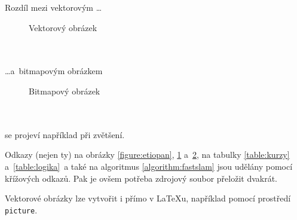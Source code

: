 \documentclass[a4paper, 11pt]{article}
\begin{document}
	Rozdíl mezi vektorovým \dots
	\begin{figure}[h]
		\centering
		\caption{Vektorový obrázek}
		\label{figure:vektorovy}
	\end{figure} \\ \\
	\dots a~bitmapovým obrázkem
	\begin{figure}[h]
		\centering
		\caption{Bitmapový obrázek}
		\label{figure:rastrovy}
	\end{figure} \\ \\
	se projeví například při zvětšení.

	Odkazy (nejen ty) na obrázky \ref{figure:etiopan}, \ref{figure:vektorovy} a~\ref{figure:rastrovy}, na
	tabulky \ref{table:kurzy} a~\ref{table:logika}~a také na algoritmus \ref{algorithm:fastslam} jsou
	udělány pomocí křížových odkazů. Pak je ovšem potřeba zdrojový soubor přeložit dvakrát.

	Vektorové obrázky lze vytvořit i přímo v {\LaTeX}u, například pomocí prostředí\texttt{ picture}.


	\begin{landscape}

	\end{landscape}
\end{document}
